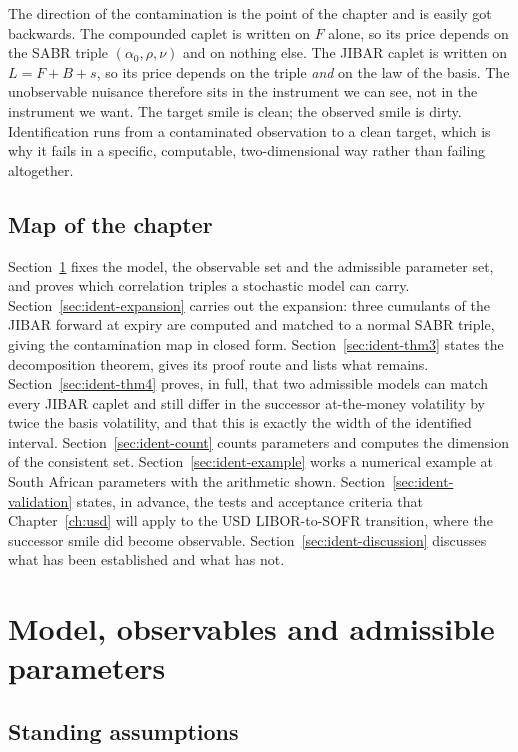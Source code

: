 \documentclass[../../../main.tex]{subfiles}
\begin{document}
The direction of the contamination is the point of the chapter and is easily got backwards. The compounded caplet is written on $F$ alone, so its price depends on the SABR triple $(\alpha_0,\rho,\nu)$ and on nothing else. The JIBAR caplet is written on $L=F+B+s$, so its price depends on the triple \emph{and} on the law of the basis. The unobservable nuisance therefore sits in the instrument we can see, not in the instrument we want. The target smile is clean; the observed smile is dirty. Identification runs from a contaminated observation to a clean target, which is why it fails in a specific, computable, two-dimensional way rather than failing altogether.

\subsection{Map of the chapter}

Section~\ref{sec:ident-model} fixes the model, the observable set and the admissible parameter set, and proves which correlation triples a stochastic model can carry. Section~\ref{sec:ident-expansion} carries out the expansion: three cumulants of the JIBAR forward at expiry are computed and matched to a normal SABR triple, giving the contamination map in closed form. Section~\ref{sec:ident-thm3} states the decomposition theorem, gives its proof route and lists what remains. Section~\ref{sec:ident-thm4} proves, in full, that two admissible models can match every JIBAR caplet and still differ in the successor at-the-money volatility by twice the basis volatility, and that this is exactly the width of the identified interval. Section~\ref{sec:ident-count} counts parameters and computes the dimension of the consistent set. Section~\ref{sec:ident-example} works a numerical example at South African parameters with the arithmetic shown. Section~\ref{sec:ident-validation} states, in advance, the tests and acceptance criteria that Chapter~\ref{ch:usd} will apply to the USD LIBOR-to-SOFR transition, where the successor smile did become observable. Section~\ref{sec:ident-discussion} discusses what has been established and what has not.

\section{Model, observables and admissible parameters}\label{sec:ident-model}

\subsection{Standing assumptions}
\end{document}
